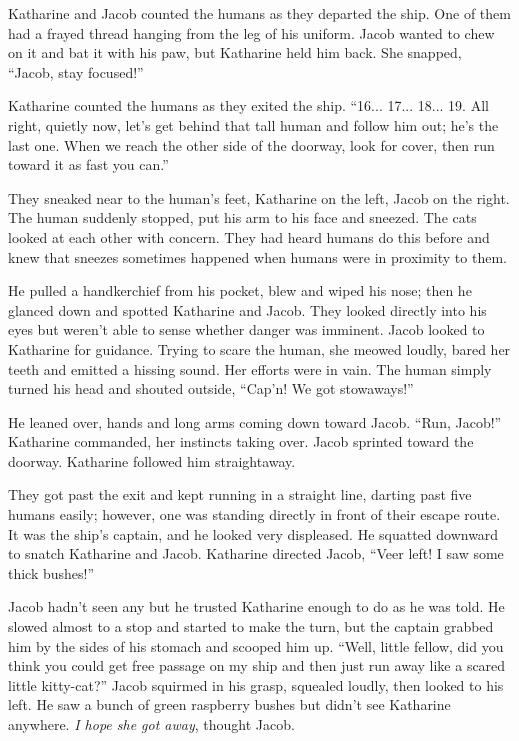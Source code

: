 Katharine and Jacob counted the humans as they departed the ship. One of them had a frayed thread hanging from the leg of his uniform. Jacob wanted to chew on it and bat it with his paw, but Katharine held him back. She snapped,  “Jacob, stay focused!”

Katharine counted the humans as they exited the ship. “16... 17... 18... 19. All right, quietly now, let's get behind that tall human and follow him out; he's the last one. When we reach the other side of the doorway, look for cover, then run toward it as fast you can.”

They sneaked near to the human's feet, Katharine on the left, Jacob on the right. The human suddenly stopped, put his arm to his face and sneezed. The cats looked at each other with concern. They had heard humans do this before and knew that sneezes sometimes happened when humans were in proximity to them.

He pulled a handkerchief from his pocket, blew and wiped his nose; then he glanced down and spotted Katharine and Jacob. They looked directly into his eyes but weren't able to sense whether danger was imminent. Jacob looked to Katharine for guidance. Trying to scare the human, she meowed loudly, bared her teeth and emitted a hissing sound. Her efforts were in vain. The human simply turned his head and shouted outside, “Cap'n! We got stowaways!”

He leaned over, hands and long arms coming down toward Jacob. “Run, Jacob!” Katharine commanded, her instincts taking over. Jacob sprinted toward the doorway. Katharine followed him straightaway.

They got past the exit and kept running in a straight line, darting past five humans easily; however, one was standing directly in front of their escape route. It was the ship's captain, and he looked very displeased. He squatted downward to snatch Katharine and Jacob. Katharine directed Jacob, “Veer left! I saw some thick bushes!”

Jacob hadn't seen any but he trusted Katharine enough to do as he was told. He slowed almost to a stop and started to make the turn, but the captain grabbed him by the sides of his stomach and scooped him up. “Well, little fellow, did you think you could get free passage on my ship and then just run away like a scared little kitty-cat?” Jacob squirmed in his grasp, squealed loudly, then looked to his left. He saw a bunch of green raspberry bushes but didn't see Katharine anywhere. \textit{I hope she got away}, thought Jacob.

